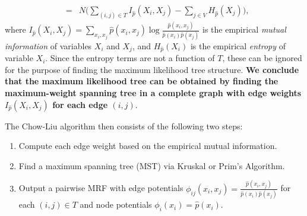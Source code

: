 \documentclass{article}
\begin{document}
\begin{enumerate}
\begin{eqnarray*}
&=& N\Big(\sum_{(i,j)\in T} I_{\hat{p}}(X_i, X_j) - \sum_{j\in V} H_{\hat{p}}(X_j)\Big),
\end{eqnarray*}
where $I_{\hat{p}}(X_i,X_j)=\sum_{x_i,x_j} \hat{p}(x_i,x_j)\log\frac{\hat{p}(x_i,x_j)}{\hat{p}(x_i)\hat{p}(x_j)}$ is the empirical {\em mutual information} of variables $X_i$ and $X_j$, and $H_{\hat{p}}(X_i)$ is the empirical {\em entropy} of variable $X_i$. Since the entropy terms are not a function of $T$, these can be ignored for the purpose of finding the maximum likelihood tree structure. {\bf We conclude that the maximum likelihood tree can be obtained by finding the maximum-weight spanning tree in a complete graph with edge weights $I_{\hat{p}}(X_i,X_j)$ for each edge $(i,j)$}.



The Chow-Liu algorithm then consists of the following two steps:
\begin{enumerate}
    \item Compute each edge weight based on the empirical mutual information.
    \item Find a maximum spanning tree (MST) via Kruskal or Prim's Algorithm.
    \item Output a pairwise MRF with edge potentials $\phi_{ij}(x_i,x_j) = \frac{\hat{p}(x_i,x_j)}{\hat{p}(x_i)\hat{p}(x_j)}$ for each $(i,j)\in T$ and node potentials $\phi_i(x_i) = \hat{p}(x_i)$.
\end{enumerate}


\end{enumerate}
\end{document}
